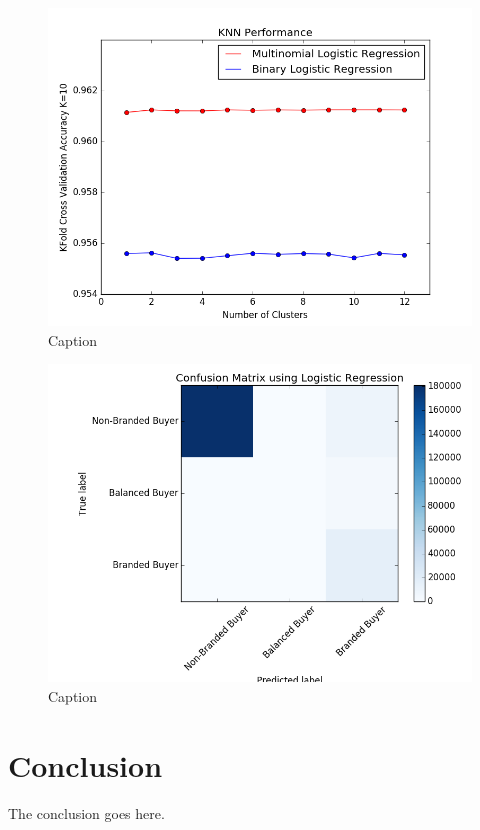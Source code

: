 \documentclass[conference]{IEEEtran}
\begin{document}
\begin{figure}
\centering
        \includegraphics[totalheight=6cm]{cluster-analysis-combined}
    \caption{Caption}
    \label{fig:verticalcell}
\end{figure}

\begin{figure}
\centering
        \includegraphics[totalheight=6cm]{confusion-matrix-multinomial}
    \caption{Caption}
    \label{fig:verticalcell}
\end{figure}


\section{Conclusion}
The conclusion goes here.
\end{document}

